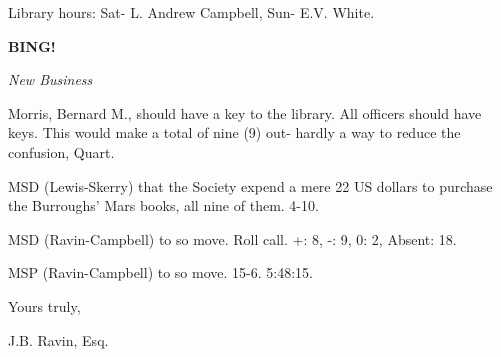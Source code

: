 \documentclass[12pt]{article}
\newcommand{\bing}{{\bf BING!} }
\newcommand{\goto}[1]{\bing \vskip 12pt \centerline{{\em{#1}}}}
\begin{document}
Library hours: Sat- L. Andrew Campbell, Sun- E.V. White.

\goto{New Business}

Morris, Bernard M., should have a key to the library. All officers should have keys. This would make a total of nine (9) out- hardly a way to reduce the confusion, Quart.

MSD (Lewis-Skerry) that the Society expend a mere 22 US dollars to purchase the Burroughs' Mars books, all nine of them. 4-10.

MSD (Ravin-Campbell) to so move. Roll call. +: 8, -: 9, 0: 2, Absent: 18.

MSP (Ravin-Campbell) to so move. 15-6. 5:48:15.

\vspace{12pt}

\centerline{Yours truly,}
\centerline{J.B. Ravin, Esq.}
\end{document}
